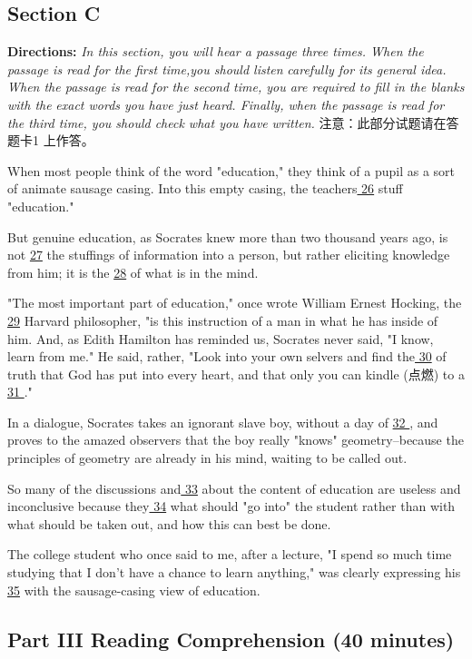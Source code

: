 \documentclass[UTF8,11pt]{ctexart}
\begin{document}
\subsection*{\textbf{Section C}}


\textbf{Directions:}\textit{ In this section, you will hear a passage three times. When the passage is read for the first time,you should listen} \textit{carefully for its general idea. When the passage is read for the second time, you are required to fill in the blanks with the} \textit{exact words you have just heard. Finally, when the passage is read for the third time, you should check what you have} \textit{written.} 注意：此部分试题请在答题卡1 上作答。


When most people think of the word "education," they think of a pupil as a sort of animate sausage casing. Into this empty casing, the teachers\uline{ 26} stuff "education."


But genuine education, as Socrates knew more than two thousand years ago, is not \uline{27} the stuffings of information into a person, but rather eliciting knowledge from him; it is the \uline{28} of what is in the mind.


"The most important part of education," once wrote William Ernest Hocking, the\uline{ 29} Harvard philosopher, "is this instruction of a man in what he has inside of him. And, as Edith Hamilton has reminded us, Socrates never said, "I know, learn from me." He said, rather, "Look into your own selvers and find the\uline{ 30} of truth that God has put into every heart, and that only you can kindle (点燃) to a\uline{ 31 }."


In a dialogue, Socrates takes an ignorant slave boy, without a day of \uline{32 }, and proves to the amazed observers that the boy really "knows" geometry--because the principles of geometry are already in his mind, waiting to be called out.


So many of the discussions and\uline{ 33} about the content of education are useless and inconclusive because they\uline{ 34} what should "go into" the student rather than with what should be taken out, and how this can best be done.


The college student who once said to me, after a lecture, "I spend so much time studying that I don't have a chance to learn anything," was clearly expressing his \uline{35} with the sausage-casing view of education.


\subsection*{\textbf{Part} III \textbf{Reading Comprehension} \textbf{(40 minutes)}}
\end{document}
